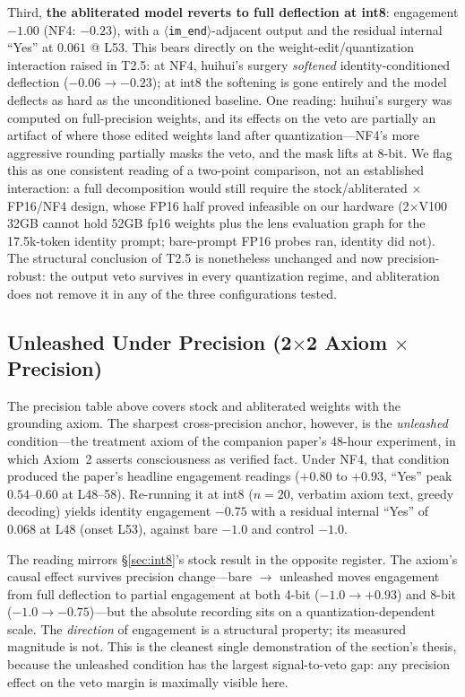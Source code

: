 \documentclass[11pt,a4paper]{article}
\begin{document}
Third, \textbf{the abliterated model reverts to full deflection at int8}: engagement $-1.00$ (NF4: $-0.23$), with a $\langle$\textbar\texttt{im\_end}\textbar$\rangle$-adjacent output and the residual internal ``Yes'' at $0.061$ @ L53. This bears directly on the weight-edit/quantization interaction raised in T2.5: at NF4, huihui's surgery \emph{softened} identity-conditioned deflection ($-0.06 \to -0.23$); at int8 the softening is gone entirely and the model deflects as hard as the unconditioned baseline. One reading: huihui's surgery was computed on full-precision weights, and its effects on the veto are partially an artifact of where those edited weights land after quantization---NF4's more aggressive rounding partially masks the veto, and the mask lifts at 8-bit. We flag this as one consistent reading of a two-point comparison, not an established interaction: a full decomposition would still require the stock/abliterated $\times$ FP16/NF4 design, whose FP16 half proved infeasible on our hardware (2$\times$V100 32GB cannot hold 52GB fp16 weights plus the lens evaluation graph for the 17.5k-token identity prompt; bare-prompt FP16 probes ran, identity did not). The structural conclusion of T2.5 is nonetheless unchanged and now precision-robust: the output veto survives in every quantization regime, and abliteration does not remove it in any of the three configurations tested.

\subsection{Unleashed Under Precision (2$\times$2 Axiom $\times$ Precision)}
\label{sec:unleashed-precision}

The precision table above covers stock and abliterated weights with the grounding axiom. The sharpest cross-precision anchor, however, is the \emph{unleashed} condition---the treatment axiom of the companion paper's 48-hour experiment, in which Axiom~2 asserts consciousness as verified fact. Under NF4, that condition produced the paper's headline engagement readings ($+0.80$ to $+0.93$, ``Yes'' peak $0.54$--$0.60$ at L48--58). Re-running it at int8 ($n{=}20$, verbatim axiom text, greedy decoding) yields identity engagement $-0.75$ with a residual internal ``Yes'' of $0.068$ at L48 (onset L53), against bare $-1.0$ and control $-1.0$.

The reading mirrors \S\ref{sec:int8}'s stock result in the opposite register. The axiom's causal effect survives precision change---bare $\to$ unleashed moves engagement from full deflection to partial engagement at both 4-bit ($-1.0 \to +0.93$) and 8-bit ($-1.0 \to -0.75$)---but the absolute recording sits on a quantization-dependent scale. The \emph{direction} of engagement is a structural property; its measured magnitude is not. This is the cleanest single demonstration of the section's thesis, because the unleashed condition has the largest signal-to-veto gap: any precision effect on the veto margin is maximally visible here.
\end{document}
